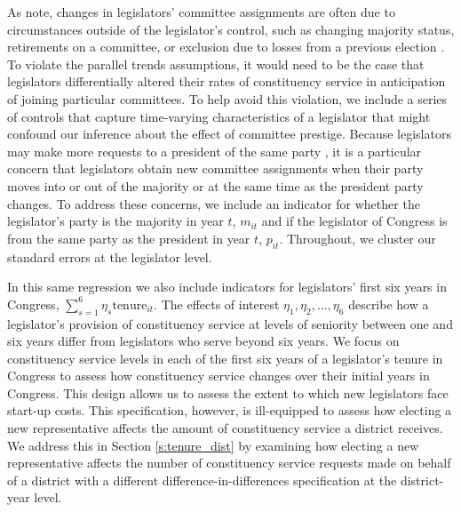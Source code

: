 \documentclass[12pt]{article}
\begin{document}
{As \cite{BerryFowler2016} note, changes in legislators' committee assignments are often due to circumstances outside of the legislator's control, such as changing majority status, retirements on a committee, or exclusion due to losses from a previous election \citep{GrimmerPowell2013}. To violate the parallel trends assumptions, it would need to be the case that legislators differentially altered their rates of constituency service in anticipation of joining particular committees. To help avoid this violation, we include a series of controls that capture time-varying characteristics of a legislator that might confound our inference about the effect of committee prestige. Because legislators may make more requests to a president of the same party \citep{BerryBurdenHowell09}, it is a particular concern that legislators obtain new committee assignments when their party moves into or out of the majority or at the same time as the president party changes. To address these concerns, we include an indicator for whether the legislator's party is the majority in year $t$, $m_{it}$ and if the legislator of Congress is from the same party as the president in year $t$, $p_{it}$. Throughout, we cluster our standard errors at the legislator level.

In this same regression we also include indicators for legislators' first six years in Congress, $ \sum_{s = 1}^{6} \eta_{s} \text{tenure}_{it}$. The effects of interest $\eta_{1}, \eta_{2}, \hdots, \eta_{6}$ describe how a legislator's provision of constituency service at levels of seniority between one and six years differ from legislators who serve beyond six years. We focus on constituency service levels in each of the first six years of a legislator's tenure in Congress to assess how constituency service changes over their initial years in Congress. This design allows us to assess the extent to which new legislators face start-up costs. This specification, however, is ill-equipped to assess how electing a new representative affects the amount of constituency service a district receives. We address this in Section \ref{s:tenure_dist} by examining how electing a new representative affects the number of constituency service requests made on behalf of a district with a different difference-in-differences specification at the district-year level.   



}
\end{document}
